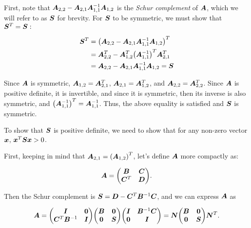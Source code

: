 \documentclass[twoside,10pt]{article}
\begin{document}
\quad First, note that $\bm{A}_{2,2} - \bm{A}_{2,1} \bm{A}_{1,1}^{-1} \bm{A}_{1,2}$ is the \textit{Schur complement} of $\bm{A}$, which we will refer to as $\bm{S}$ for brevity.
For $\bm{S}$ to be symmetric, we must show that $\bm{S}^T = \bm{S}:$ 

\begin{align*}
\mtx{S}^T &= \left(\mtx{A}_{2,2} - \mtx{A}_{2,1} \mtx{A}_{1,1}^{-1} \mtx{A}_{1,2}\right)^T\\
&= \mtx{A}_{2,2}^T - \mtx{A}_{1,2}^T \left(\mtx{A}_{1,1}^{-1}\right)^T \mtx{A}_{2,1}^T \\
&= \mtx{A}_{2,2} - \mtx{A}_{2,1} \mtx{A}_{1,1}^{-1} \mtx{A}_{1,2} = \mtx{S}
\end{align*}

\quad Since $\bm{A}$ is symmetric, $\bm{A}_{1,2} = \bm{A}_{2,1}^T$, $\bm{A}_{2,1} = \bm{A}_{1,2}^T$, and $\bm{A}_{2,2} = \bm{A}_{2,2}^T$.
Since $\bm{A}$ is positive definite, it is invertible, and since it is symmetric, then its inverse is also symmetric, and $\left(\mtx{A}_{1,1}^{-1}\right)^T = \mtx{A}_{1,1}^{-1}$.
Thus, the above equality is satisfied and $\bm{S}$ is symmetric.

To show that $\bm{S}$ is positive definite, we need to show that for any non-zero vector $\bm{x}$, $\bm{x}^T \bm{S} \bm{x} > 0$.

First, keeping in mind that $\mtx{A}_{2,1} = \left(\mtx{A}_{1,2}\right)^T$, let's define $\bm{A}$ more compactly as:

\begin{equation*}
  \mtx{A} = \begin{pmatrix}
    \mtx{B} & \mtx{C} \\
    \mtx{C}^T & \mtx{D}
  \end{pmatrix}.
\end{equation*}

Then the Schur complement is $\bm{S} = \bm{D} - \bm{C}^T \bm{B}^{-1} \bm{C}$, and we can express $\bm{A}$ as

\begin{equation*}
  \mtx{A} = \begin{pmatrix}
    \mtx{I} & \mtx{0} \\
    \mtx{C}^T\mtx{B}^{-1} & \mtx{I}
  \end{pmatrix}
  \begin{pmatrix}
    \mtx{B} & \mtx{0} \\
    \mtx{0} & \mtx{S}
  \end{pmatrix}
  \begin{pmatrix}
    \mtx{I} & \mtx{B}^{-1}\mtx{C} \\
    \mtx{0} & \mtx{I}
  \end{pmatrix}
  =
  \mtx{N}
  \begin{pmatrix}
    \mtx{B} & \mtx{0} \\
    \mtx{0} & \mtx{S}
  \end{pmatrix}
  \mtx{N}^T.
\end{equation*}
\end{document}
